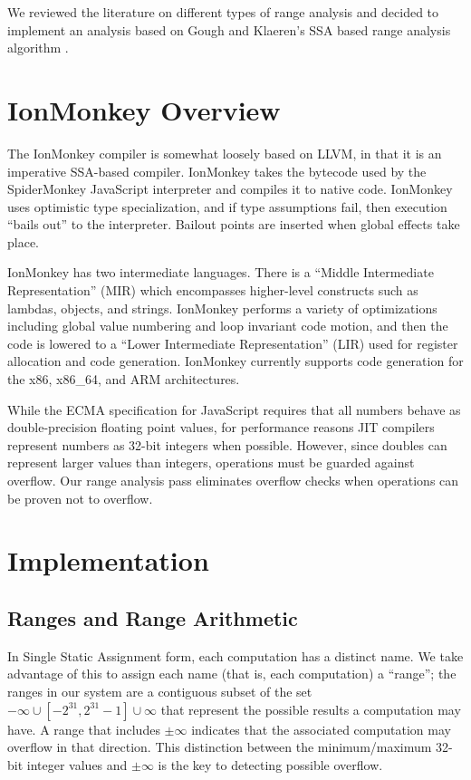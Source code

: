 \documentclass{article}
\begin{document}
We reviewed the literature on different types of range analysis and
decided to implement an analysis based on Gough and Klaeren's SSA
based range analysis algorithm \cite{Gough94eliminatingrange}.

\section{IonMonkey Overview}
The IonMonkey compiler is somewhat loosely based on LLVM, in that it is an
imperative SSA-based compiler. IonMonkey takes the bytecode used by the SpiderMonkey
JavaScript interpreter and compiles it to native code. IonMonkey uses optimistic type
specialization, and if type assumptions fail, then execution ``bails
out'' to the interpreter. Bailout points are inserted when global effects take place.

IonMonkey has two intermediate languages. There is a ``Middle
Intermediate Representation'' (MIR) which encompasses higher-level
constructs such as lambdas, objects, and strings. IonMonkey performs a variety of
optimizations including global value numbering and loop invariant code motion,
and then the code is lowered to a ``Lower Intermediate Representation'' (LIR)
used for register allocation and code generation. IonMonkey currently supports
code generation for the x86, x86\_64, and ARM architectures.

While the ECMA specification for JavaScript requires that all numbers behave as
double-precision floating point values\cite{ECMA-262}, for performance reasons JIT compilers
represent numbers as 32-bit integers when possible. However, since doubles can
represent larger values than integers, operations must be guarded against
overflow.  Our range analysis pass eliminates overflow checks when operations
can be proven not to overflow.

\section{Implementation}

\subsection{Ranges and Range Arithmetic}

In Single Static Assignment form, each computation has a distinct
name. We take advantage of this to assign each name (that is, each
computation) a ``range''; the ranges in our system are a contiguous
subset of the set ${-\infty} \cup [-2^{31}, 2^{31}-1] \cup {\infty}$
that represent the possible results a computation may have. A range
that includes $\pm \infty$ indicates that the associated
computation may overflow in that direction. This distinction between
the minimum/maximum 32-bit integer values and $\pm \infty$ is the key
to detecting possible overflow.
\end{document}
